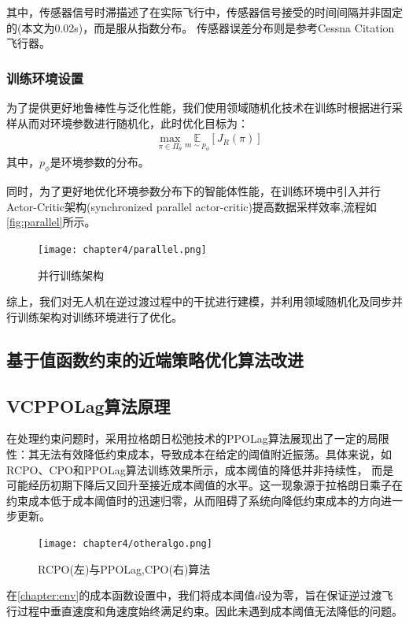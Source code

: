 其中，传感器信号时滞描述了在实际飞行中，传感器信号接受的时间间隔并非固定的(本文为0.02s)，而是服从指数分布\cite{bohn2023data}。
传感器误差分布则是参考Cessna Citation飞行器\cite{lee2021online}。

\subsubsection{训练环境设置}
为了提供更好地鲁棒性与泛化性能，我们使用领域随机化技术在训练时根据进行采样从而对环境参数进行随机化，此时优化目标为：
\begin{align}
    &\max _{\pi \in \Pi_{\theta}} \underset{m \sim p_{\phi}}{\mathbb{E}}\left [J_{R}(\pi)   \right ] 
\end{align}
其中，$p_{\phi}$是环境参数的分布。

同时，为了更好地优化环境参数分布下的智能体性能，在训练环境中引入并行Actor-Critic架构(synchronized parallel actor-critic)提高数据采样效率,流程如\autoref{fig:parallel}所示。
\begin{figure}[htbp]
    \centering
    \texttt{[image: chapter4/parallel.png]}
    \caption{\label{fig:parallel}并行训练架构}
    \label{fig:action}
\end{figure}

综上，我们对无人机在逆过渡过程中的干扰进行建模，并利用领域随机化及同步并行训练架构对训练环境进行了优化。
\subsection{基于值函数约束的近端策略优化算法改进}
\subsection{VCPPOLag算法原理}
在处理约束问题时，采用拉格朗日松弛技术的PPOLag算法展现出了一定的局限性：其无法有效降低约束成本，导致成本在给定的阈值附近振荡。具体来说，如
RCPO\cite{tessler2018reward}、CPO\cite{achiam2017constrained}和PPOLag算法训练效果所示，成本阈值的降低并非持续性，
而是可能经历初期下降后又回升至接近成本阈值的水平。这一现象源于拉格朗日乘子在约束成本低于成本阈值时的迅速归零，从而阻碍了系统向降低约束成本的方向进一步更新。
\begin{figure}[htbp]
    \centering
    \texttt{[image: chapter4/otheralgo.png]}
    \caption{\label{fig:otheralgo}RCPO(左)与PPOLag,CPO(右)算法}
\end{figure}

在\autoref{chapter:env}的成本函数设置中，我们将成本阈值$d$设为零，旨在保证逆过渡飞行过程中垂直速度和角速度始终满足约束。因此未遇到成本阈值无法降低的问题。

